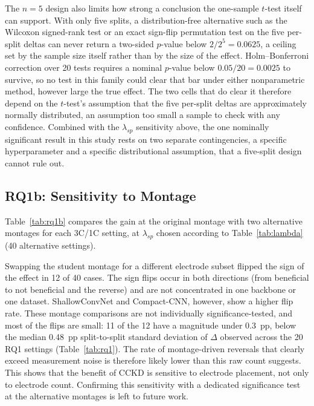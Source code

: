 \documentclass[11pt,a4paper,twoside,asymmetric]{article}
\begin{document}
The $n=5$ design also limits how strong a conclusion the one-sample $t$-test itself can support. With only five splits, a distribution-free alternative such as the Wilcoxon signed-rank test or an exact sign-flip permutation test on the five per-split deltas can never return a two-sided $p$-value below $2/2^5=0.0625$, a ceiling set by the sample size itself rather than by the size of the effect. Holm--Bonferroni correction over 20 tests requires a nominal $p$-value below $0.05/20=0.0025$ to survive, so no test in this family could clear that bar under either nonparametric method, however large the true effect. The two cells that do clear it therefore depend on the $t$-test's assumption that the five per-split deltas are approximately normally distributed, an assumption too small a sample to check with any confidence. Combined with the $\lambda_{sp}$ sensitivity above, the one nominally significant result in this study rests on two separate contingencies, a specific hyperparameter and a specific distributional assumption, that a five-split design cannot rule out.

\subsection{RQ1b: Sensitivity to Montage}
\label{sec:rq1b}

Table~\ref{tab:rq1b} compares the gain at the original montage with two alternative montages for each 3C/1C setting, at $\lambda_{sp}$ chosen according to Table~\ref{tab:lambda} (40 alternative settings).

Swapping the student montage for a different electrode subset flipped the sign of the effect in 12 of 40 cases. The sign flips occur in both directions (from beneficial to not beneficial and the reverse) and are not concentrated in one backbone or one dataset. ShallowConvNet and Compact-CNN, however, show a higher flip rate. These montage comparisons are not individually significance-tested, and most of the flips are small: 11 of the 12 have a magnitude under 0.3~pp, below the median 0.48~pp split-to-split standard deviation of $\Delta$ observed across the 20 RQ1 settings (Table~\ref{tab:rq1}). The rate of montage-driven reversals that clearly exceed measurement noise is therefore likely lower than this raw count suggests. This shows that the benefit of CCKD is sensitive to electrode placement, not only to electrode count. Confirming this sensitivity with a dedicated significance test at the alternative montages is left to future work.
\end{document}
